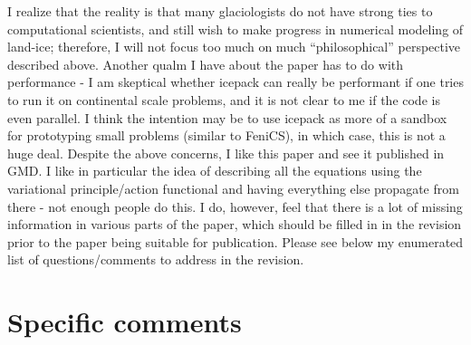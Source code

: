 \documentclass{article}
\theoremstyle{definition}
\theoremstyle{plain}
\begin{document}
{I realize that the reality is that many glaciologists do not have strong ties to computational scientists, and
still wish to make progress in numerical modeling of land-ice; therefore, I will not focus too much on much
``philosophical'' perspective described above.
Another qualm I have about the paper has to do with performance - I am skeptical whether icepack
can really be performant if one tries to run it on continental scale problems, and it is not clear to me if
the code is even parallel. I think the intention may be to use icepack as more of a sandbox for prototyping
small problems (similar to FeniCS), in which case, this is not a huge deal.
Despite the above concerns, I like this paper and see it published in GMD. I like in particular the
idea of describing all the equations using the variational principle/action functional and having everything
else propagate from there - not enough people do this. I do, however, feel that there is a lot of missing
information in various parts of the paper, which should be filled in in the revision prior to the paper being
suitable for publication. Please see below my enumerated list of questions/comments to address in the
revision.}

\section*{Specific comments}
\end{document}
